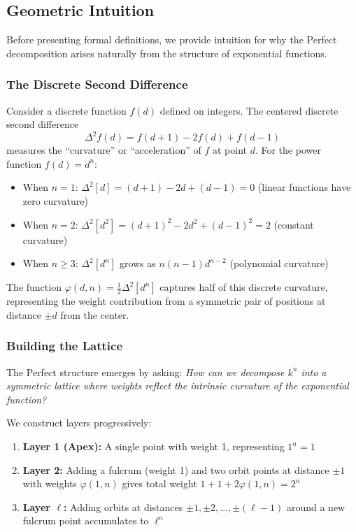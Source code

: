 \documentclass[11pt]{article}
\begin{document}
\subsection{Geometric Intuition}

Before presenting formal definitions, we provide intuition for why the Perfect decomposition arises naturally from the structure of exponential functions.

\subsubsection*{The Discrete Second Difference}
Consider a discrete function $f(d)$ defined on integers. The centered discrete second difference
\[
\Delta^2 f(d) = f(d+1) - 2f(d) + f(d-1)
\]
measures the ``curvature'' or ``acceleration'' of $f$ at point $d$. For the power function $f(d) = d^n$:
\begin{itemize}
    \item When $n = 1$: $\Delta^2[d] = (d+1) - 2d + (d-1) = 0$ (linear functions have zero curvature)
    \item When $n = 2$: $\Delta^2[d^2] = (d+1)^2 - 2d^2 + (d-1)^2 = 2$ (constant curvature)
    \item When $n \geq 3$: $\Delta^2[d^n]$ grows as $n(n-1)d^{n-2}$ (polynomial curvature)
\end{itemize}

The function $\varphi(d,n) = \frac{1}{2}\Delta^2[d^n]$ captures half of this discrete curvature, representing the weight contribution from a symmetric pair of positions at distance $\pm d$ from the center.

\subsubsection*{Building the Lattice}
The Perfect structure emerges by asking: \emph{How can we decompose $k^n$ into a symmetric lattice where weights reflect the intrinsic curvature of the exponential function?}

We construct layers progressively:
\begin{enumerate}
    \item \textbf{Layer 1 (Apex):} A single point with weight 1, representing $1^n = 1$
    \item \textbf{Layer 2:} Adding a fulcrum (weight 1) and two orbit points at distance $\pm 1$ with weights $\varphi(1,n)$ gives total weight $1 + 1 + 2\varphi(1,n) = 2^n$
    \item \textbf{Layer $\ell$:} Adding orbits at distances $\pm 1, \pm 2, \ldots, \pm(\ell-1)$ around a new fulcrum point accumulates to $\ell^n$
\end{enumerate}
\end{document}
